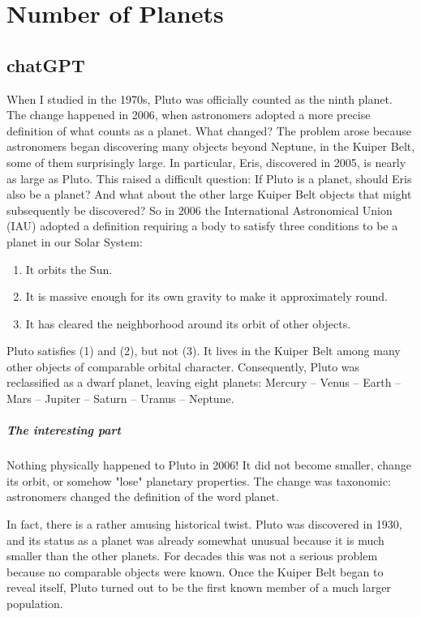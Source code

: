 \chapter{Number of Planets}
\section{chatGPT}

When I studied in the 1970s, Pluto was officially counted as the ninth planet. The change happened in 2006, when astronomers adopted a more precise definition of what counts as a planet.
What changed?
The problem arose because astronomers began discovering many objects beyond Neptune, in the Kuiper Belt, some of them surprisingly large. In particular, Eris, discovered in 2005, is nearly as large as Pluto.
This raised a difficult question:
If Pluto is a planet, should Eris also be a planet? And what about the other large Kuiper Belt objects that might subsequently be discovered?
So in 2006 the International Astronomical Union (IAU) adopted a definition requiring a body to satisfy three conditions to be a planet in our Solar System:
\begin{enumerate}
   \item It orbits the Sun.
   \item It is massive enough for its own gravity to make it approximately round.
   \item It has cleared the neighborhood around its orbit of other objects.
\end{enumerate}
Pluto satisfies (1) and (2), but not (3). It lives in the Kuiper Belt among many other objects of comparable orbital character.
Consequently, Pluto was reclassified as a dwarf planet, leaving eight planets:
Mercury – Venus – Earth – Mars – Jupiter – Saturn – Uranus – Neptune.
\paragraph{The interesting part}
Nothing physically happened to Pluto in 2006!
It did not become smaller, change its orbit, or somehow "lose" planetary properties. The change was taxonomic: astronomers changed the definition of the word planet.

In fact, there is a rather amusing historical twist. Pluto was discovered in 1930, and its status as a planet was already somewhat unusual because it is much smaller than the other planets. For decades this was not a serious problem because no comparable objects were known.
Once the Kuiper Belt began to reveal itself, Pluto turned out to be the first known member of a much larger population.

